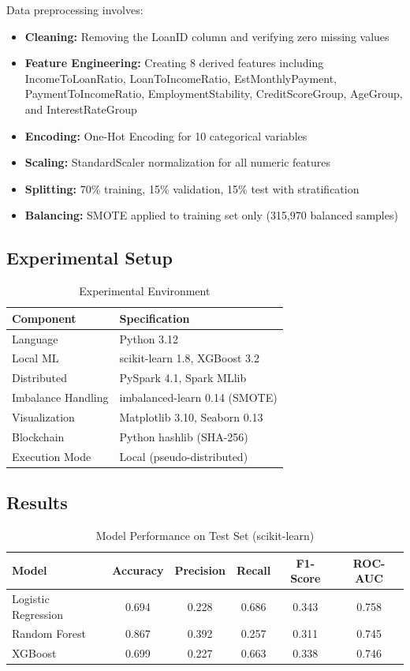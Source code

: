 \documentclass[runningheads]{llncs}
\begin{document}
Data preprocessing involves:
\begin{itemize}
    \item \textbf{Cleaning:} Removing the LoanID column and verifying zero missing values
    \item \textbf{Feature Engineering:} Creating 8 derived features including IncomeToLoanRatio, LoanToIncomeRatio, EstMonthlyPayment, PaymentToIncomeRatio, EmploymentStability, CreditScoreGroup, AgeGroup, and InterestRateGroup
    \item \textbf{Encoding:} One-Hot Encoding for 10 categorical variables
    \item \textbf{Scaling:} StandardScaler normalization for all numeric features
    \item \textbf{Splitting:} 70\% training, 15\% validation, 15\% test with stratification
    \item \textbf{Balancing:} SMOTE applied to training set only (315,970 balanced samples)
\end{itemize}

\subsection{Experimental Setup}

\begin{table}[H]
\centering
\caption{Experimental Environment}
\label{tab:setup}
\begin{tabular}{@{}ll@{}}
\toprule
Component & Specification \\
\midrule
Language & Python 3.12 \\
Local ML & scikit-learn 1.8, XGBoost 3.2 \\
Distributed & PySpark 4.1, Spark MLlib \\
Imbalance Handling & imbalanced-learn 0.14 (SMOTE) \\
Visualization & Matplotlib 3.10, Seaborn 0.13 \\
Blockchain & Python hashlib (SHA-256) \\
Execution Mode & Local (pseudo-distributed) \\
\bottomrule
\end{tabular}
\end{table}

\subsection{Results}

\begin{table}[H]
\centering
\caption{Model Performance on Test Set (scikit-learn)}
\label{tab:local_results}
\begin{tabular}{@{}lccccc@{}}
\toprule
Model & Accuracy & Precision & Recall & F1-Score & ROC-AUC \\
\midrule
Logistic Regression & 0.694 & 0.228 & 0.686 & 0.343 & 0.758 \\
Random Forest & 0.867 & 0.392 & 0.257 & 0.311 & 0.745 \\
XGBoost & 0.699 & 0.227 & 0.663 & 0.338 & 0.746 \\
\bottomrule
\end{tabular}
\end{table}
\end{document}
